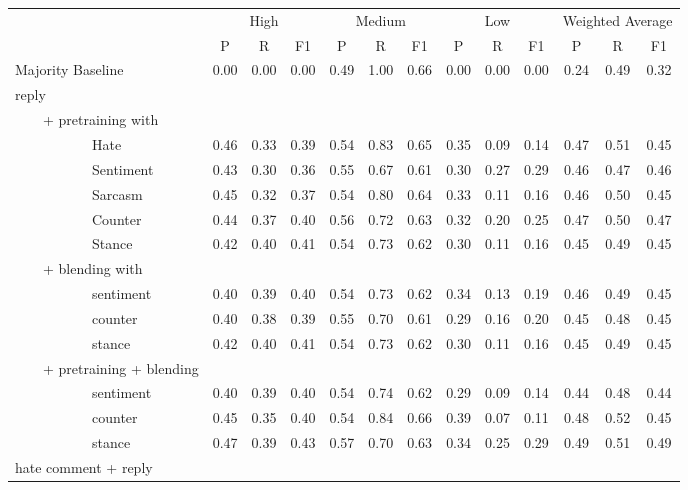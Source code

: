 \documentclass[11pt]{article}
\begin{document}
	\begin{table*}
		\small
		\centering
		\setlength{\tabcolsep}{.07in}
		\begin{tabular}{l ccc ccc ccc ccc}
			\toprule
			\multicolumn{1}{c}{} & \multicolumn{3}{c}{High} & \multicolumn{3}{c}{Medium} & \multicolumn{3}{c}{Low} & \multicolumn{3}{c}{Weighted Average} \\
			\cmidrule(lr){2-4} \cmidrule(lr){5-7} \cmidrule(lr){8-10} \cmidrule(lr){11-13} 
			& P & R & F1 & P & R & F1 & P & R & F1 & P & R & F1 \\
			\hline \addlinespace 
			Majority Baseline &0.00 & 	0.00&	0.00&	0.49	&1.00	&0.66	&0.00	&0.00&	0.00&	0.24	&0.49&	0.32 \\		
			reply\\
			~~~~+ pretraining with \\
			~~~~~~~~~~~Hate & 0.46&	0.33&	0.39&	0.54&	0.83	&0.65&	0.35&	0.09&	0.14	&0.47	&0.51&	0.45\\
			~~~~~~~~~~~Sentiment & 0.43&	 0.30&	0.36&	0.55&	0.67&	0.61&	0.30&	0.27&	0.29&	0.46&	0.47&	0.46\\
			~~~~~~~~~~~Sarcasm & 0.45&	0.32&	0.37&	0.54&	0.80&	0.64&	0.33&	0.11	&0.16&	0.46&	0.50&	0.45\\
			~~~~~~~~~~~Counter & 0.44&	0.37&	0.40	&0.56&	0.72	&0.63&	0.32&	0.20&	0.25&	0.47&	0.50&	0.47\\
			~~~~~~~~~~~Stance & 0.42	&0.40&	0.41	&0.54&	0.73&	0.62&	0.30&	0.11&	0.16&	0.45&	0.49&	0.45\\
			~~~~+ blending with\\
		    ~~~~~~~~~~~sentiment& 	0.40& 	0.39& 	0.40	& 0.54& 	0.73	& 0.62& 	0.34& 	0.13& 	0.19& 	0.46& 	0.49& 	0.45 \\
			~~~~~~~~~~~counter& 	0.40& 	0.38& 	0.39& 	0.55& 	0.70& 	0.61& 	0.29& 	0.16& 	0.20& 	0.45& 	0.48& 	0.45 \\
			~~~~~~~~~~~stance	& 0.42	& 0.40& 	0.41& 	0.54& 	0.73	& 0.62& 	0.30& 	0.11& 	0.16	& 0.45& 	0.49& 	0.45 \\
			~~~~+ pretraining + blending \\
			~~~~~~~~~~~sentiment& 	0.40	& 0.39	& 0.40& 	0.54& 	0.74	& 0.62	& 0.29& 	0.09& 	0.14	& 0.44& 	0.48& 	0.44 \\
			~~~~~~~~~~~counter&  	0.45& 	0.35& 	0.40& 	0.54& 	0.84& 	0.66& 	0.39& 	0.07& 	0.11& 	0.48& 	0.52	& 0.45 \\
			~~~~~~~~~~~stance& 	0.47& 	0.39	& 0.43& 	0.57& 	0.70	& 0.63	& 0.34& 	0.25& 	0.29& 	0.49& 	0.51& 	0.49 \\
			hate comment + reply\\

\end{tabular}
\end{table*}
\end{document}
